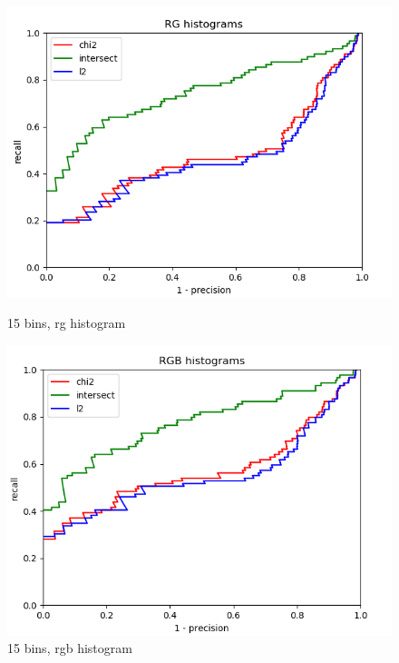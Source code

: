 \documentclass{article}
\begin{document}
\begin{figure}[ht]
    \centering
    \begin{minipage}{.5\textwidth}
        \includegraphics[width=\linewidth]{images/Q4.b-rg_histogram_15_bins.png}
        \cprotect\caption{15 bins, rg histogram}
    \end{minipage}\hfill
    \begin{minipage}{.5\textwidth}
        \includegraphics[width=\linewidth]{images/Q4.b-rgb_histogram_15_bins.png}
        \cprotect\caption{15 bins, rgb histogram}
    \end{minipage}
    \begin{minipage}{.5\textwidth}

\end{minipage}
\end{figure}
\end{document}
